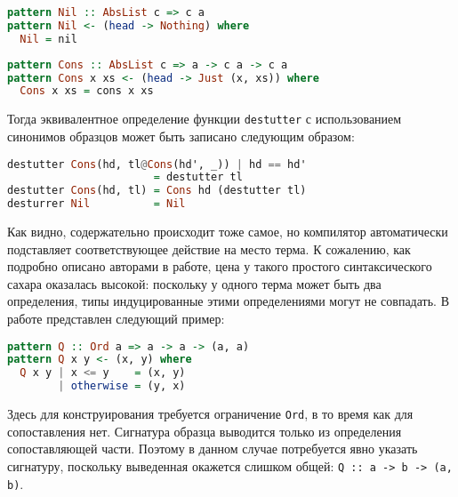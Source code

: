 \noindent
\begin{minipage}{\linewidth}
\begin{lstlisting}[language=haskell]
pattern Nil :: AbsList c => c a
pattern Nil <- (head -> Nothing) where
  Nil = nil
\end{lstlisting}
\end{minipage}

\noindent
\begin{minipage}{\linewidth}
\begin{lstlisting}[language=haskell]
pattern Cons :: AbsList c => a -> c a -> c a
pattern Cons x xs <- (head -> Just (x, xs)) where
  Cons x xs = cons x xs
\end{lstlisting}
\end{minipage}

Тогда эквивалентное определение функции \lstinline|destutter| с использованием синонимов образцов может быть записано следующим образом:

\noindent
\begin{minipage}{\linewidth}
\begin{lstlisting}[language=haskell]
destutter Cons(hd, tl@Cons(hd', _)) | hd == hd' 
                       = destutter tl
destutter Cons(hd, tl) = Cons hd (destutter tl)
desturrer Nil          = Nil
\end{lstlisting}
\end{minipage}

Как видно, содержательно происходит тоже самое, но компилятор автоматически подставляет соответствующее действие на место терма. К сожалению, как подробно описано авторами в работе, цена у такого простого синтаксического сахара оказалась высокой: поскольку у одного терма может быть два определения, типы индуцированные этими определениями могут не совпадать. В работе представлен следующий пример:

\noindent
\begin{minipage}{\linewidth}
\begin{lstlisting}[language=haskell]
pattern Q :: Ord a => a -> a -> (a, a)
pattern Q x y <- (x, y) where
  Q x y | x <= y    = (x, y)
        | otherwise = (y, x)
\end{lstlisting}
\end{minipage}

Здесь для конструирования требуется ограничение \lstinline|Ord|, в то время как для сопоставления нет. Сигнатура образца выводится только из определения сопоставляющей части. Поэтому в данном случае потребуется явно указать сигнатуру, поскольку выведенная окажется слишком общей: \lstinline|Q :: a -> b -> (a, b)|.

